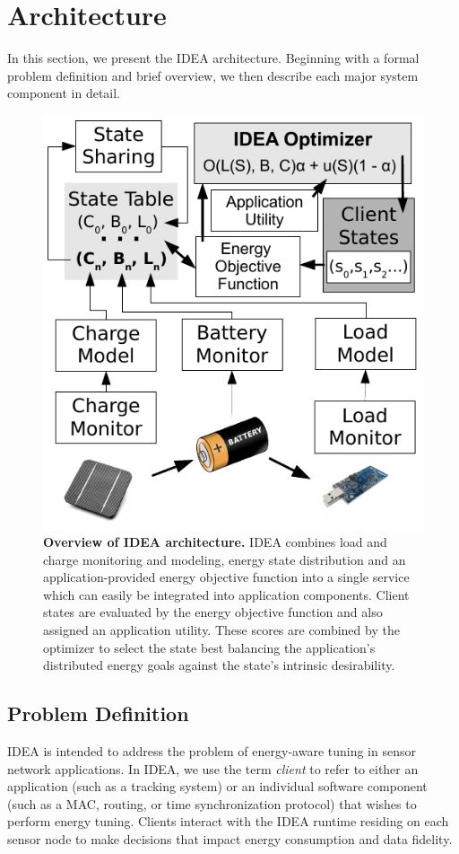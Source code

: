 \section{Architecture}
\label{idea-sec-architecture}

In this section, we present the IDEA architecture. Beginning with a formal
problem definition and brief overview, we then describe each major system
component in detail.

\begin{figure}[t]
\begin{center}
\includegraphics[width=0.5\hsize]{./5-idea/figs/architecture.pdf}
\end{center}

\caption{\textbf{Overview of IDEA architecture.} IDEA combines load and
charge monitoring and modeling, energy state distribution and an
application-provided energy objective function into a single service which
can easily be integrated into application components. Client states are
evaluated by the energy objective function and also assigned an application
utility. These scores are combined by the optimizer to select the state best
balancing the application's distributed energy goals against the state's
intrinsic desirability.}

\label{idea-fig-architecture}
\end{figure}

\subsection{Problem Definition}

IDEA is intended to address the problem of energy-aware tuning in sensor
network applications. In IDEA, we use the term \textit{client} to refer to
either an application (such as a tracking system) or an individual software
component (such as a MAC, routing, or time synchronization protocol) that
wishes to perform energy tuning. Clients interact with the IDEA runtime
residing on each sensor node to make decisions that impact energy consumption
and data fidelity.

